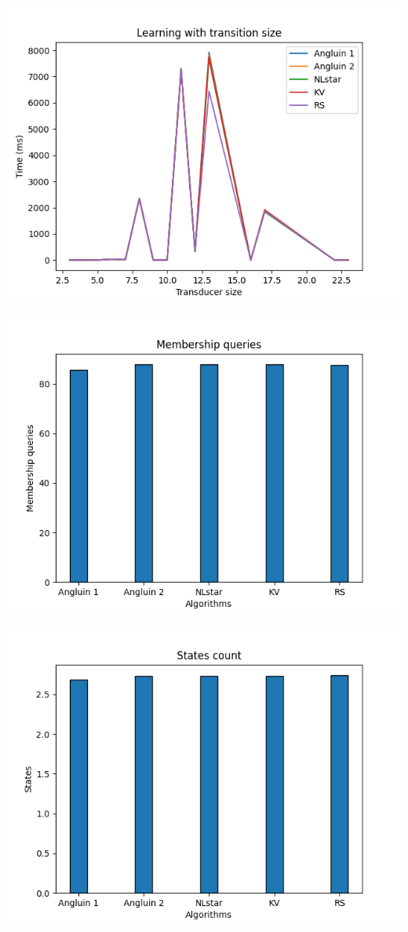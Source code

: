 \includegraphics[scale=0.75]{figures/transition_size.png}

\includegraphics[scale=0.75]{figures/average_membership.png}

\includegraphics[scale=0.75]{figures/average_stateCount.png}